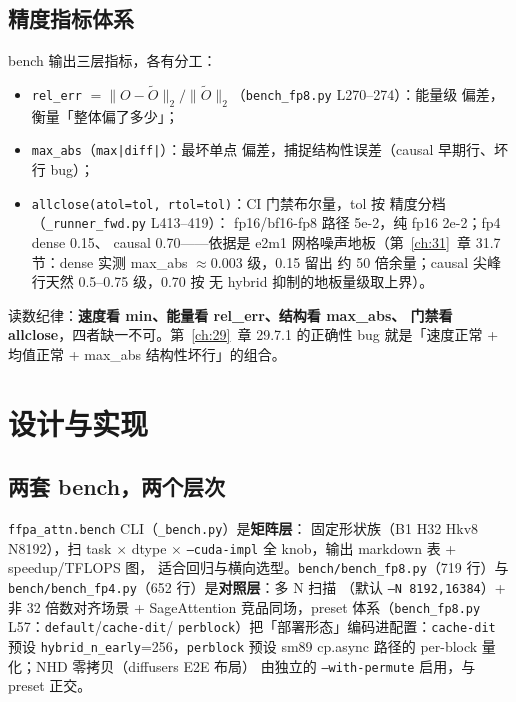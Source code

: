 \subsection{精度指标体系}

bench 输出三层指标，各有分工：
\begin{itemize}[itemsep=0pt,topsep=2pt]
  \item \texttt{rel\_err} $=\lVert O-\tilde O\rVert_2/\lVert
        \tilde O\rVert_2$（\texttt{bench\_fp8.py} L270--274）：能量级
        偏差，衡量「整体偏了多少」；
  \item \texttt{max\_abs}（\texttt{max|diff|}）：最坏单点
        偏差，捕捉结构性误差（causal 早期行、坏行 bug）；
  \item \texttt{allclose(atol=tol, rtol=tol)}：CI 门禁布尔量，tol 按
        精度分档（\texttt{\_runner\_fwd.py} L413--419）：
        fp16/bf16-fp8 路径 5e-2，纯 fp16 2e-2；fp4 dense 0.15、
        causal 0.70——依据是 e2m1 网格噪声地板（第~\ref{ch:31}~章
        31.7 节：dense 实测 max\_abs $\approx$0.003 级，0.15 留出
        约 50 倍余量；causal 尖峰行天然 0.5--0.75 级，0.70 按
        无 hybrid 抑制的地板量级取上界）。
\end{itemize}
读数纪律：\textbf{速度看 min、能量看 rel\_err、结构看 max\_abs、
门禁看 allclose}，四者缺一不可。第~\ref{ch:29}~章 29.7.1 的正确性
bug 就是「速度正常 + 均值正常 + max\_abs 结构性坏行」的组合。

\section{设计与实现}

\subsection{两套 bench，两个层次}

\texttt{ffpa\_attn.bench} CLI（\texttt{\_bench.py}）是\textbf{矩阵层}：
固定形状族（B1 H32 Hkv8 N8192），扫 task $\times$ dtype $\times$
\texttt{--cuda-impl} 全 knob，输出 markdown 表 + speedup/TFLOPS 图，
适合回归与横向选型。\texttt{bench/bench\_fp8.py}（719 行）与
\texttt{bench/bench\_fp4.py}（652 行）是\textbf{对照层}：多 N 扫描
（默认 \texttt{--N 8192,16384}）+ 非 32 倍数对齐场景 + SageAttention
竞品同场，preset
体系（\texttt{bench\_fp8.py} L57：\texttt{default}/\texttt{cache-dit}/
\texttt{perblock}）把「部署形态」编码进配置：\texttt{cache-dit} 预设
\texttt{hybrid\_n\_early}=256，\texttt{perblock} 预设
sm89 cp.async 路径的 per-block 量化；NHD 零拷贝（diffusers E2E 布局）
由独立的 \texttt{--with-permute} 启用，与 preset 正交。

